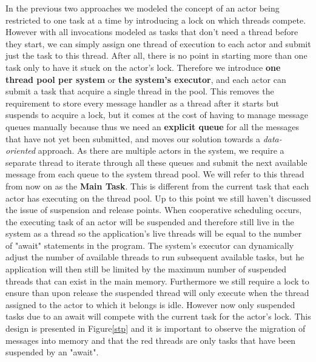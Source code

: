 In the previous two approaches we modeled the concept of an actor being restricted to one task at a time by introducing a lock on which threads compete.  However with all invocations modeled as tasks that don't need a thread before they start, we can simply assign one thread of execution to each actor and submit just the task to this thread. After all, there is no point in starting more than one task only to have it stuck on the actor's lock. Therefore we introduce \textbf{one thread pool per system} or \textbf{the system's executor}, and each actor can submit a task that acquire a single thread in the pool. This removes the requirement to store every message handler as a thread after it starts but suspends to acquire a lock, but it comes at the cost of having to manage message queues manually because thus we need an \textbf{explicit queue} for all the messages that have not yet been submitted, and moves our solution towards a \textit{data-oriented} approach. As there are multiple actors in the system, we require a separate thread to iterate through all these queues and submit the next available message from each queue to the system thread pool. We will refer to this thread from now on as the \textbf{Main Task}. This is different from the current task that each actor has executing on the thread pool. Up to this point we still haven't discussed the issue of suspension and release points. When cooperative scheduling occurs, the executing task of an actor will be suspended and therefore still live in the system as a thread so the application's live threads will be equal to the number of "await" statements in the program. The system's executor can dynamically adjust the number of  available threads to run subsequent available tasks, but he application will then still be limited by the maximum number of suspended threads that can exist in the main memory.  Furthermore we still require a lock to ensure than upon release the suspended thread will only execute when the thread assigned to the actor to which it belongs is idle. However now only suspended tasks due to an await will compete with the current task for the actor's lock. This design is presented in Figure\ref{stp} and it is important to observe the migration of messages into memory and that the red threads are only tasks that have been suspended by an "await".


